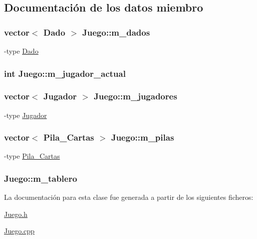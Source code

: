 \subsection{Documentación de los datos miembro}
\hypertarget{class_juego_a9ffb7ca3c51b48a865a009e1f20d7f31}{
\subsubsection[{m\-\_\-dados}]{\setlength{\rightskip}{0pt plus 5cm}vector$<$ {\bf Dado} $>$ Juego\-::m\-\_\-dados}}\label{class_juego_a9ffb7ca3c51b48a865a009e1f20d7f31}
-\/type \hyperlink{class_dado}{Dado} \hypertarget{class_juego_adffd6dea5ae36c243402d2401cd9848e}{
\subsubsection[{m\-\_\-jugador\-\_\-actual}]{\setlength{\rightskip}{0pt plus 5cm}int Juego\-::m\-\_\-jugador\-\_\-actual}}\label{class_juego_adffd6dea5ae36c243402d2401cd9848e}
\hypertarget{class_juego_ae9f2b6939836c66d00e3745ebd2dc466}{
\subsubsection[{m\-\_\-jugadores}]{\setlength{\rightskip}{0pt plus 5cm}vector$<$ {\bf Jugador} $>$ Juego\-::m\-\_\-jugadores}}\label{class_juego_ae9f2b6939836c66d00e3745ebd2dc466}
-\/type \hyperlink{class_jugador}{Jugador} \hypertarget{class_juego_aa1cd4f06e664635c86bc07ddaff214f1}{
\subsubsection[{m\-\_\-pilas}]{\setlength{\rightskip}{0pt plus 5cm}vector$<$ {\bf Pila\-\_\-\-Cartas} $>$ Juego\-::m\-\_\-pilas}}\label{class_juego_aa1cd4f06e664635c86bc07ddaff214f1}
-\/type \hyperlink{class_pila___cartas}{Pila\-\_\-\-Cartas} \hypertarget{class_juego_a4a9eae54cdd122d941e15e1dfb65dcac}{
\subsubsection[{m\-\_\-tablero}]{ Juego\-::m\-\_\-tablero}}\label{class_juego_a4a9eae54cdd122d941e15e1dfb65dcac}


La documentación para esta clase fue generada a partir de los siguientes ficheros\-:\begin{DoxyCompactItemize}
\item 
\hyperlink{_juego_8h}{Juego.\-h}\item 
\hyperlink{_juego_8cpp}{Juego.\-cpp}\end{DoxyCompactItemize}
